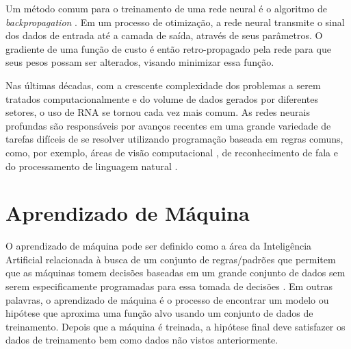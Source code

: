 Um método comum para o treinamento de uma rede neural é o algoritmo de \textit{backpropagation}  \cite{rumelhart86}. Em um processo de otimização, a rede neural transmite o sinal dos dados de entrada até a camada de saída, através de seus parâmetros. O gradiente de uma função de custo é então retro-propagado pela rede para que seus pesos possam ser alterados, visando minimizar essa função. 

Nas últimas décadas, com a crescente complexidade dos problemas a serem tratados computacionalmente e do volume de dados gerados por diferentes setores, o uso de RNA se tornou cada vez mais comum. As redes neurais profundas são responsáveis por avanços recentes em uma grande variedade de tarefas difíceis de se resolver utilizando programação baseada em regras comuns, como, por exemplo, áreas de visão computacional \cite{Krizhevsky12}, de reconhecimento de fala \cite{NassifSAAS19} e do processamento de linguagem natural \cite{otter2018}.

\section{Aprendizado de Máquina}


O aprendizado de máquina pode ser definido como a área da Inteligência Artificial relacionada à busca de um conjunto de regras/padrões que permitem que as máquinas tomem decisões baseadas em um grande conjunto de dados sem serem especificamente programadas para essa tomada de decisões \cite{Samuel59}. Em outras palavras, o aprendizado de máquina é o processo de encontrar um modelo ou hipótese que aproxima uma função alvo usando um conjunto de dados de treinamento. Depois que a máquina é treinada, a hipótese final deve satisfazer os dados de treinamento bem como dados não vistos anteriormente.

